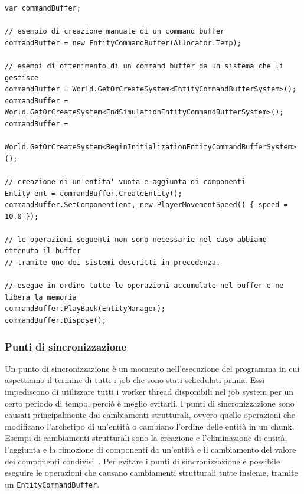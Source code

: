 \begin{lstlisting}[caption={Esempi di utilizzo di \UseVerb{EntityCommandBufferTerm}.}, label={lst:entitycommandbuffer-example}, language={[Sharp]C}]
var commandBuffer;

// esempio di creazione manuale di un command buffer
commandBuffer = new EntityCommandBuffer(Allocator.Temp);

// esempi di ottenimento di un command buffer da un sistema che li gestisce
commandBuffer = World.GetOrCreateSystem<EntityCommandBufferSystem>();
commandBuffer = World.GetOrCreateSystem<EndSimulationEntityCommandBufferSystem>();
commandBuffer = 
    World.GetOrCreateSystem<BeginInitializationEntityCommandBufferSystem>();

// creazione di un'entita' vuota e aggiunta di componenti
Entity ent = commandBuffer.CreateEntity();
commandBuffer.SetComponent(ent, new PlayerMovementSpeed() { speed = 10.0 });

// le operazioni seguenti non sono necessarie nel caso abbiamo ottenuto il buffer
// tramite uno dei sistemi descritti in precedenza.

// esegue in ordine tutte le operazioni accumulate nel buffer e ne libera la memoria
commandBuffer.PlayBack(EntityManager);
commandBuffer.Dispose();
\end{lstlisting}

\subsubsection{Punti di sincronizzazione}
Un punto di sincronizzazione è un momento nell'esecuzione del programma in cui aspettiamo il termine di tutti i job che sono stati schedulati prima. Essi impediscono di utilizzare tutti i worker thread disponibili nel job system per un certo periodo di tempo, perciò è meglio evitarli.
I punti di sincronizzazione sono causati principalmente dai cambiamenti strutturali, ovvero quelle operazioni che modificano l'archetipo di un'entità o cambiano l'ordine delle entità in un chunk. Esempi di cambiamenti strutturali sono la creazione e l'eliminazione di entità, l'aggiunta e la rimozione di componenti da un'entità e il cambiamento del valore dei componenti condivisi~\cite{doc:unity-entities-manual}. Per evitare i punti di sincronizzazione è possibile eseguire le operazioni che causano cambiamenti strutturali tutte insieme, tramite un \verb|EntityCommandBuffer|.




